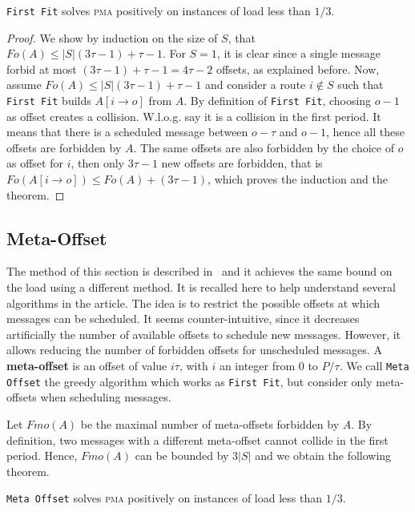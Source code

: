 \documentclass[a4paper,cleveref, autoref, thm-restate,UKenglish]{lipics-v2019}
\newcommand\pma{\textsc{pma}\xspace}
\newcommand\firstfit{\texttt{First Fit}\xspace}
\newcommand\metaoffset{\texttt{Meta Offset}\xspace}
\begin{document}
\begin{theorem}
\firstfit solves \pma positively on instances of load less than $1/3$. 
\end{theorem}
\begin{proof}
We show by induction on the size of $S$, that $Fo(A) \leq |S|(3\tau -1) + \tau -1$. For $S = 1$, it is clear since a single message forbid at most $(3\tau -1) + \tau -1 = 4\tau-2$ offsets, as explained before. Now, assume $Fo(A) \leq |S|(3\tau -1) + \tau -1$ and consider a route $i \notin S$ such that \firstfit builds $A[i \rightarrow o]$ from $A$. By definition of \firstfit, choosing $o-1$ as offset creates a collision. W.l.o.g. say it is a collision in the first period. It means that there is a scheduled message between $o - \tau $ and $o-1$, hence all these offsets are forbidden by $A$. The same offsets are also forbidden by the choice of $o$ as offset for $i$, then only $3\tau -1$ new offsets are forbidden, that is $Fo(A[i \rightarrow o]) \leq Fo(A) + (3\tau -1)$, which proves the induction and the theorem.
\end{proof}

\subsection{Meta-Offset}

The method of this section is described in~\cite{dominique2018deterministic} and it achieves the same bound on the load using a different method. It is recalled here to help understand several algorithms in the article.
The idea is to restrict the possible offsets at which messages can be scheduled. It seems counter-intuitive, since it decreases artificially the number of available offsets to schedule new messages. However, it allows reducing the number of forbidden offsets for unscheduled messages. A \textbf{meta-offset} is an offset of value $i\tau$,
with $i$ an integer from $0$ to $P / \tau$. We call \metaoffset the greedy algorithm which works as \firstfit, but consider only meta-offsets when scheduling messages. 

Let $Fmo(A)$ be the maximal number of meta-offsets forbidden by $A$. 
 By definition, two messages with a different meta-offset cannot collide in the first period.
Hence, $Fmo(A)$ can be bounded by $3|S|$ and we obtain the following theorem.


\begin{theorem}
\metaoffset solves \pma positively on instances of load less than $1/3$.
\end{theorem}
\end{document}
